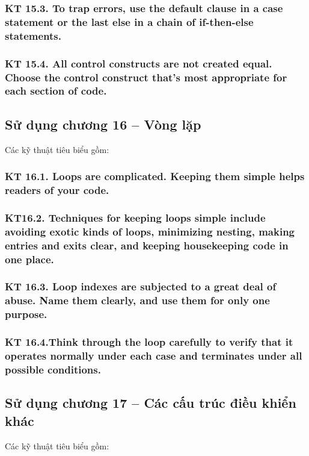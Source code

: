 \documentclass[12pt]{report}
\begin{document}
\subsubsection{KT 15.3. To trap errors, use the default clause in a case statement or the last else in a chain of if-then-else statements.}

\subsubsection{KT 15.4. All control constructs are not created equal. Choose the control construct that's most appropriate for each section of code.}


\subsection{Sử dụng chương 16 – Vòng lặp}
\noindent Các kỹ thuật tiêu biểu gồm: 

\subsubsection{KT 16.1. Loops are complicated. Keeping them simple helps readers of your code.}

\subsubsection{KT16.2. Techniques for keeping loops simple include avoiding exotic kinds of loops, minimizing nesting, making entries and exits clear, and keeping housekeeping code in one place.}

\subsubsection{KT 16.3. Loop indexes are subjected to a great deal of abuse. Name them clearly, and use them for only one purpose.}

\subsubsection{KT 16.4.Think through the loop carefully to verify that it operates normally under each case and terminates under all possible conditions.}


\subsection{Sử dụng chương 17 – Các cấu trúc điều khiển khác}
\noindent Các kỹ thuật tiêu biểu gồm: 
\end{document}
